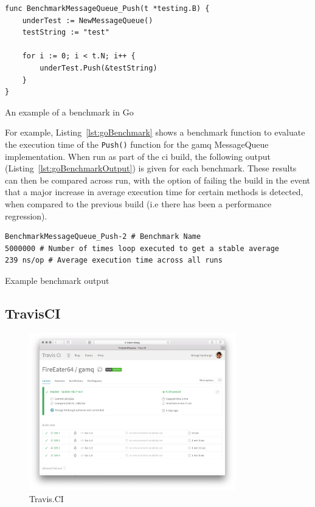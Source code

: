 \begin{listing}
  \centering
  \begin{verbatim}
func BenchmarkMessageQueue_Push(t *testing.B) {
	underTest := NewMessageQueue()
	testString := "test"

	for i := 0; i < t.N; i++ {
		underTest.Push(&testString)
	}
}
  \end{verbatim}
  \caption{An example of a benchmark in Go}
  \label{lst:goBenchmark}
\end{listing}

For example, Listing~\ref{lst:goBenchmark} shows a benchmark function to
evaluate the execution time of the \texttt{Push()} function for the \gls{gamq}
MessageQueue implementation. When run as part of the \gls{ci} build, the
following output (Listing~\ref{lst:goBenchmarkOutput}) is given for each
benchmark. These results can then be compared across run, with the option of failing the build in the event that a major increase in
average execution time for certain methods is detected, when compared to the
previous build (i.e there has been a performance regression).

\begin{listing}
  \centering
  \begin{verbatim}
BenchmarkMessageQueue_Push-2 # Benchmark Name
5000000 # Number of times loop executed to get a stable average
239 ns/op # Average execution time across all runs
  \end{verbatim}
  \caption{Example benchmark output}
  \label{lst:goBenchmarkOutput}
\end{listing}


\subsection{TravisCI}
\label{sub:TravisCI}

\begin{figure}[H]
  \includegraphics[width=0.8\textwidth]{figures/travisScreenshot}
  \centering
  \caption{Travis.CI}
  \label{fig:travisCI}
\end{figure}

